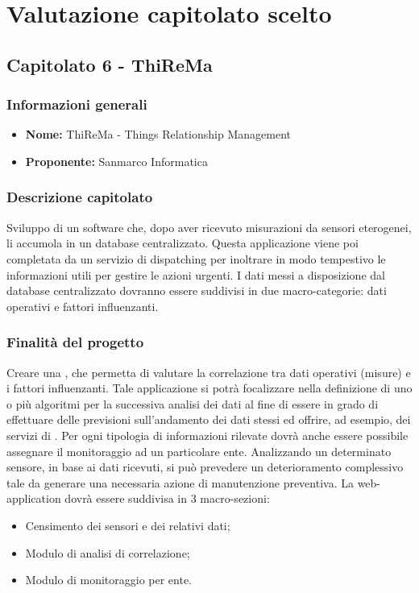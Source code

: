 

\section{Valutazione capitolato scelto}

	\subsection{Capitolato 6 - ThiReMa}
	
	\subsubsection{Informazioni generali}
	\begin{itemize}
		\item \textbf{Nome:} ThiReMa - Things Relationship Management
		\item \textbf{Proponente:} Sanmarco Informatica
	\end{itemize}
	
	\subsubsection{Descrizione capitolato}
	Sviluppo di un software che,  dopo aver ricevuto misurazioni da sensori eterogenei, li accumola in un database centralizzato. Questa applicazione viene poi completata da un servizio di dispatching per inoltrare in modo tempestivo le informazioni utili per gestire le azioni urgenti.
	I dati messi a disposizione dal database centralizzato dovranno essere suddivisi in due macro-categorie: dati operativi e fattori influenzanti.
	
	\subsubsection{Finalità del progetto}
	Creare una , che permetta di valutare la correlazione tra dati operativi (misure) e i fattori influenzanti. Tale applicazione si potrà focalizzare nella definizione di uno o più algoritmi per la successiva analisi dei dati al fine di essere in grado di effettuare delle previsioni sull’andamento dei dati stessi ed offrire, ad esempio, dei servizi di .
	Per ogni tipologia di informazioni rilevate dovrà anche essere possibile assegnare il monitoraggio ad un particolare ente. 
	Analizzando un determinato sensore, in base ai dati ricevuti, si può prevedere un deterioramento complessivo tale da generare una necessaria azione di manutenzione preventiva.
	La web-application dovrà essere suddivisa in 3 macro-sezioni:
	\begin{itemize}
		\item Censimento dei sensori e dei relativi dati;
		\item Modulo di analisi di correlazione;
		\item Modulo di monitoraggio per ente.
	\end{itemize}
	
